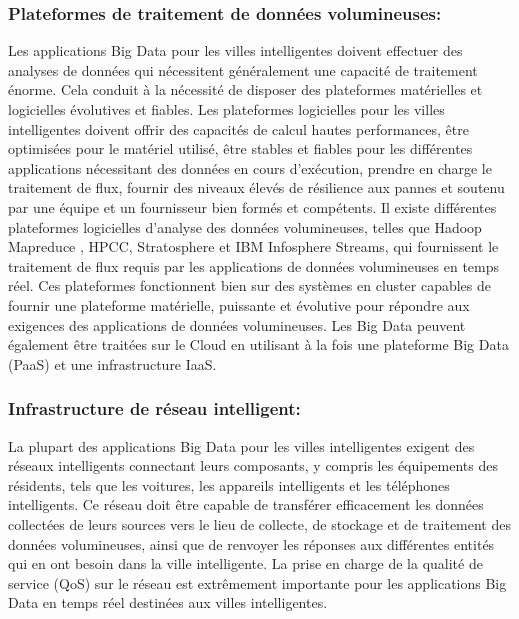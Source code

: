 \documentclass[french, a4paper, 12pt]{report}
\begin{document}
\subsubsection{Plateformes de traitement de données volumineuses:}
Les applications Big Data pour les villes intelligentes doivent effectuer des analyses de données qui nécessitent généralement une capacité de traitement énorme. Cela conduit à la nécessité de disposer des plateformes matérielles et logicielles évolutives et fiables. Les plateformes logicielles pour les villes intelligentes doivent offrir des capacités de calcul hautes performances, être optimisées pour le matériel utilisé, être stables et fiables pour les différentes applications nécessitant des données en cours d'exécution, prendre en charge le traitement de flux, fournir des niveaux élevés de résilience aux pannes et soutenu par une équipe et un fournisseur bien formés et compétents. Il existe différentes plateformes logicielles d'analyse des données volumineuses, telles que Hadoop Mapreduce , HPCC, Stratosphere et IBM Infosphere Streams, qui fournissent le traitement de flux requis par les applications de données volumineuses en temps réel. Ces plateformes fonctionnent bien sur des systèmes en cluster capables de fournir une plateforme matérielle, puissante et évolutive pour répondre aux exigences des applications de données volumineuses. Les Big Data peuvent également être traitées sur le Cloud en utilisant à la fois une plateforme Big Data (PaaS) et une infrastructure IaaS.\\
\subsubsection{Infrastructure de réseau intelligent:}

La plupart des applications Big Data pour les villes intelligentes exigent des réseaux intelligents connectant leurs composants, y compris les équipements des résidents, tels que les voitures, les appareils intelligents et les téléphones intelligents. Ce réseau doit être capable de transférer efficacement les données collectées de leurs sources vers le lieu de collecte, de stockage et de traitement des données volumineuses, ainsi que de renvoyer les réponses aux différentes entités qui en ont besoin dans la ville intelligente. La prise en charge de la qualité de service (QoS) sur le réseau est extrêmement importante pour les applications Big Data en temps réel destinées aux villes intelligentes. \\
\end{document}

